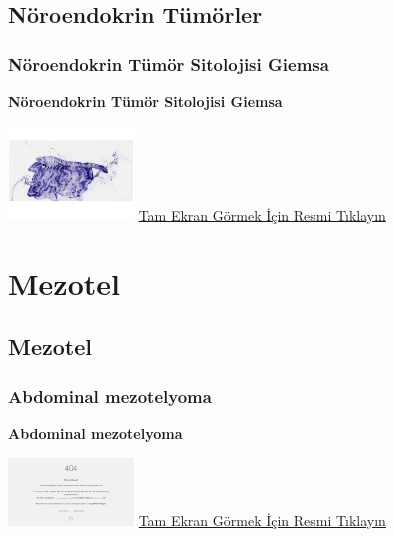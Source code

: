 \documentclass[
  letterpaper,
  DIV=11,
  numbers=noendperiod]{scrreprt}
\begin{document}
\hypertarget{sec-noroendokrin-tumorler}{%
\chapter{Nöroendokrin Tümörler}\label{sec-noroendokrin-tumorler}}

\hypertarget{sec-noroendokrin-tumor-sitolojisi-giemsa}{%
\section{Nöroendokrin Tümör Sitolojisi
Giemsa}\label{sec-noroendokrin-tumor-sitolojisi-giemsa}}

\textbf{Nöroendokrin Tümör Sitolojisi Giemsa}

\href{https://images.patolojiatlasi.com/template/HE.html}{\includegraphics[width=0.25\textwidth,height=\textheight]{./screenshots/neuroendocrine-cytology-giemsa_screenshot.png}}
\href{https://images.patolojiatlasi.com/neuroendocrine-cytology/giemsa.html}{Tam
Ekran Görmek İçin Resmi Tıklayın}

\part{Mezotel}

\hypertarget{sec-mezotel}{%
\chapter{Mezotel}\label{sec-mezotel}}

\hypertarget{sec-abdominal-mezotelyoma}{%
\section{Abdominal mezotelyoma}\label{sec-abdominal-mezotelyoma}}

\textbf{Abdominal mezotelyoma}

\href{https://images.patolojiatlasi.com/abdominal-mezotelyoma/HE.html}{\includegraphics[width=0.25\textwidth,height=\textheight]{./screenshots/abdominal-mezotelyoma_screenshot.png}}
\href{https://images.patolojiatlasi.com/abdominal-mesothelioma/HE.html}{Tam
Ekran Görmek İçin Resmi Tıklayın}
\end{document}
